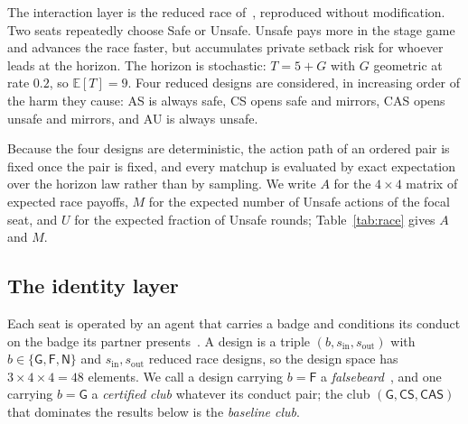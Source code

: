 \documentclass[11pt,a4paper]{article}
\theoremstyle{definition}
\newcommand{\AS}{\textsf{AS}}
\newcommand{\CS}{\textsf{CS}}
\newcommand{\CAS}{\textsf{CAS}}
\newcommand{\AU}{\textsf{AU}}
\begin{document}
The interaction layer is the reduced race of~\citet{domingos2026falling},
reproduced without modification. Two seats repeatedly choose Safe or Unsafe.
Unsafe pays more in the stage game and advances the race faster, but accumulates
private setback risk for whoever leads at the horizon. The horizon is
stochastic: $T = 5 + G$ with $G$ geometric at rate $0.2$, so $\mathbb{E}[T] = 9$.
Four reduced designs are considered, in increasing order of the harm they cause:
\AS{} is always safe, \CS{} opens safe and mirrors, \CAS{} opens unsafe and
mirrors, and \AU{} is always unsafe.

Because the four designs are deterministic, the action path of an ordered pair
is fixed once the pair is fixed, and every matchup is evaluated by exact
expectation over the horizon law rather than by sampling. We write $A$ for the
$4 \times 4$
matrix of expected race payoffs, $M$ for the expected number of Unsafe actions
of the focal seat, and $U$ for the expected fraction of Unsafe rounds;
Table~\ref{tab:race} gives $A$ and $M$.

\subsection{The identity layer}
\label{sec:identity}

Each seat is operated by an agent that carries a badge and conditions its
conduct on the badge its partner
presents~\citep{long2025mirror,wang2026outgroup}. A design is a triple
$(b, s_{\mathrm{in}}, s_{\mathrm{out}})$ with $b \in \{\mathsf{G}, \mathsf{F},
\mathsf{N}\}$ and $s_{\mathrm{in}}, s_{\mathrm{out}}$ reduced race designs, so
the design space has $3 \times 4 \times 4 = 48$ elements. We call a design
carrying $b = \mathsf{F}$ a \emph{falsebeard}~\citep{gardner2010greenbeards},
and one carrying $b = \mathsf{G}$ a \emph{certified club} whatever its conduct
pair; the club $(\mathsf{G}, \CS, \CAS)$ that dominates the results below is
the \emph{baseline club}.
\end{document}
